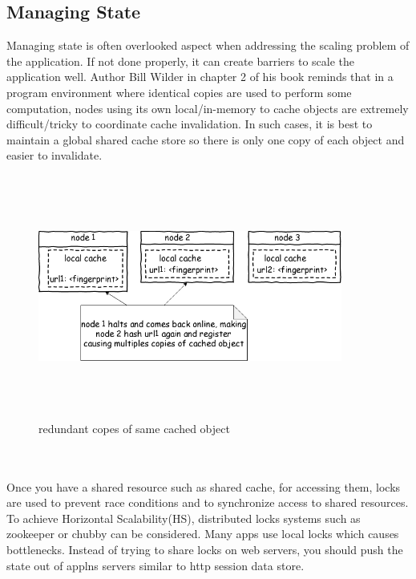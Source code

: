\subsection{Managing State}\label{managestate}
Managing state is often overlooked aspect when addressing the scaling problem of the application. If not done properly, it can create barriers to scale the application well. Author Bill Wilder in chapter 2 of his
book\cite{manstate} reminds that in a program environment where identical copies are used to perform some computation, nodes using its own local/in-memory to cache objects are extremely difficult/tricky to coordinate cache invalidation. In such cases, it is best to maintain a global shared cache store so there is only one copy of each object and easier to invalidate.
\begin{figure}[h!]
  \centering
  \includegraphics[width=10cm,height=8cm,keepaspectratio]{../media/crawler/multi-cache-wrng.png}
  \caption{redundant copes of same cached object}
  \label{fig:wrngcache}
\end{figure}
\\
\\
\noindent
Once you have a shared resource such as shared cache, for accessing them, locks are used to prevent race conditions and to synchronize access to shared resources. To achieve Horizontal Scalability(HS), distributed locks systems such as zookeeper \cite{zookeeper} or chubby \cite{chubby} can be considered. Many apps use local locks which causes bottlenecks. Instead of trying to share locks on web servers, you
should push the state out of applns servers similar to http session data store.

